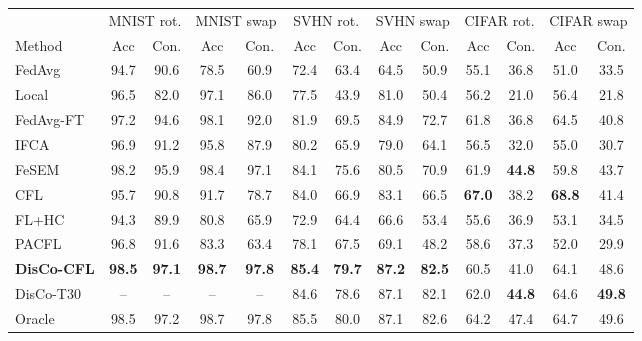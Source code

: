 \begin{tabular}{lcccccccccccc}
\toprule
 & \multicolumn{2}{c}{MNIST rot.} & \multicolumn{2}{c}{MNIST swap} & \multicolumn{2}{c}{SVHN rot.} & \multicolumn{2}{c}{SVHN swap} & \multicolumn{2}{c}{CIFAR rot.} & \multicolumn{2}{c}{CIFAR swap} \\
\cmidrule(lr){2-3}\cmidrule(lr){4-5}\cmidrule(lr){6-7}\cmidrule(lr){8-9}\cmidrule(lr){10-11}\cmidrule(lr){12-13}
Method & Acc & Con. & Acc & Con. & Acc & Con. & Acc & Con. & Acc & Con. & Acc & Con. \\
\midrule
FedAvg & 94.7 & 90.6 & 78.5 & 60.9 & 72.4 & 63.4 & 64.5 & 50.9 & 55.1 & 36.8 & 51.0 & 33.5 \\
Local & 96.5 & 82.0 & 97.1 & 86.0 & 77.5 & 43.9 & 81.0 & 50.4 & 56.2 & 21.0 & 56.4 & 21.8 \\
FedAvg-FT & 97.2 & 94.6 & 98.1 & 92.0 & 81.9 & 69.5 & 84.9 & 72.7 & 61.8 & 36.8 & 64.5 & 40.8 \\
IFCA & 96.9 & 91.2 & 95.8 & 87.9 & 80.2 & 65.9 & 79.0 & 64.1 & 56.5 & 32.0 & 55.0 & 30.7 \\
FeSEM & 98.2 & 95.9 & 98.4 & 97.1 & 84.1 & 75.6 & 80.5 & 70.9 & 61.9 & \textbf{44.8} & 59.8 & 43.7 \\
CFL & 95.7 & 90.8 & 91.7 & 78.7 & 84.0 & 66.9 & 83.1 & 66.5 & \textbf{67.0} & 38.2 & \textbf{68.8} & 41.4 \\
FL+HC & 94.3 & 89.9 & 80.8 & 65.9 & 72.9 & 64.4 & 66.6 & 53.4 & 55.6 & 36.9 & 53.1 & 34.5 \\
PACFL & 96.8 & 91.6 & 83.3 & 63.4 & 78.1 & 67.5 & 69.1 & 48.2 & 58.6 & 37.3 & 52.0 & 29.9 \\
\textbf{DisCo-CFL} & \textbf{98.5} & \textbf{97.1} & \textbf{98.7} & \textbf{97.8} & \textbf{85.4} & \textbf{79.7} & \textbf{87.2} & \textbf{82.5} & 60.5 & 41.0 & 64.1 & 48.6 \\
DisCo-T30 & -- & -- & -- & -- & 84.6 & 78.6 & 87.1 & 82.1 & 62.0 & \textbf{44.8} & 64.6 & \textbf{49.8} \\
\midrule
Oracle & 98.5 & 97.2 & 98.7 & 97.8 & 85.5 & 80.0 & 87.1 & 82.6 & 64.2 & 47.4 & 64.7 & 49.6 \\
\bottomrule
\end{tabular}
